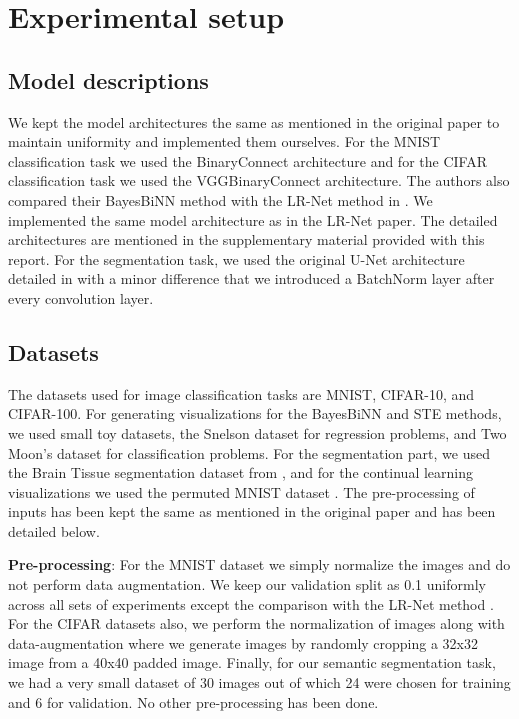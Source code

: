 \section{Experimental setup}

\subsection{Model descriptions}
We kept the model architectures the same as mentioned in the original paper to maintain uniformity and implemented them ourselves. For the MNIST classification task we used the BinaryConnect architecture and for the CIFAR classification task we used the VGGBinaryConnect architecture. The authors also compared their BayesBiNN method with the LR-Net method in \citet{r8}. We implemented the same model architecture as in the LR-Net paper. The detailed architectures are mentioned in the supplementary material provided with this report. For the segmentation task, we used the original U-Net architecture detailed in \citet{r11} with a minor difference that we introduced a BatchNorm layer after every convolution layer.

\subsection{Datasets}
The datasets used for image classification tasks are MNIST, CIFAR-10, and CIFAR-100. For generating visualizations for the BayesBiNN and STE methods, we used small toy datasets, the Snelson dataset \citet{r9} for regression problems, and Two Moon's dataset \citet{r10} for classification problems. For the segmentation part, we used the Brain Tissue segmentation dataset from \citet{r11}, and for the continual learning visualizations we used the permuted MNIST dataset \citet{r12}. The pre-processing of inputs has been kept the same as mentioned in the original paper and has been detailed below.

\textbf{Pre-processing}: For the MNIST dataset we simply normalize the images and do not perform data augmentation. We keep our validation split as 0.1 uniformly across all sets of experiments except the comparison with the LR-Net method \citet{r8}. For the CIFAR datasets also, we perform the normalization of images along with data-augmentation where we generate images by randomly cropping a 32x32 image from a 40x40 padded image. Finally, for our semantic segmentation task, we had a very small dataset of 30 images out of which 24 were chosen for training and 6 for validation. No other pre-processing has been done.

